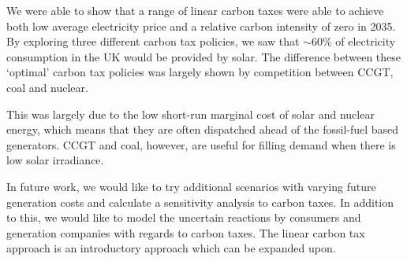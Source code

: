 We were able to show that a range of linear carbon taxes were able to achieve both low average electricity price and a relative carbon intensity of zero in 2035. By exploring three different carbon tax policies, we saw that ${\sim}$60\% of electricity consumption in the UK would be provided by solar. The difference between these `optimal' carbon tax policies was largely shown by competition between CCGT, coal and nuclear.

This was largely due to the low short-run marginal cost of solar and nuclear energy, which means that they are often dispatched ahead of the fossil-fuel based generators. CCGT and coal, however, are useful for filling demand when there is low solar irradiance.

In future work, we would like to try additional scenarios with varying future generation costs and calculate a sensitivity analysis to carbon taxes. In addition to this, we would like to model the uncertain reactions by consumers and generation companies with regards to carbon taxes. The linear carbon tax approach is an introductory approach which can be expanded upon.

